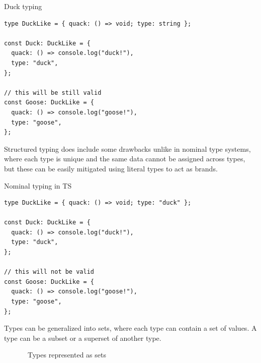 \begin{listing}[h]
  \caption{Duck typing}
  \begin{verbatim}
type DuckLike = { quack: () => void; type: string };

const Duck: DuckLike = {
  quack: () => console.log("duck!"),
  type: "duck",
};

// this will be still valid
const Goose: DuckLike = {
  quack: () => console.log("goose!"),
  type: "goose",
};
\end{verbatim}
\end{listing}

Structured typing does include some drawbacks unlike in nominal type systems, where each type is unique and the same data cannot be assigned across types, but these can be easily mitigated using literal types to act as brands.

\begin{listing}[h]
  \caption{Nominal typing in TS}
  \begin{verbatim}
type DuckLike = { quack: () => void; type: "duck" };

const Duck: DuckLike = {
  quack: () => console.log("duck!"),
  type: "duck",
};

// this will not be valid
const Goose: DuckLike = {
  quack: () => console.log("goose!"),
  type: "goose",
};
\end{verbatim}
\end{listing}


Types can be generalized into sets, where each type can contain a set of values. A type can be a subset or a superset of another type.

\begin{figure}[h]
  \centering
  \caption{~Types represented as sets}
\end{figure}

